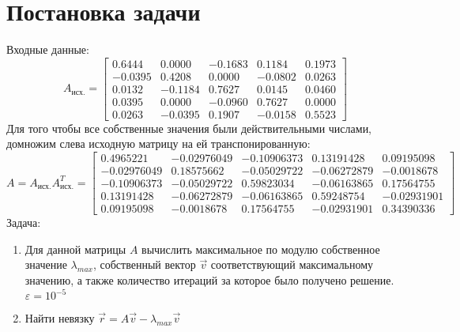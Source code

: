 \documentclass[11.4pt]{article}
\begin{document}
\section{Постановка задачи}
	Входные данные:
	\[ A_{\text{исх.}}=
		\left[
			\begin{array}{ccccc}
				0.6444 & 0.0000 & -0.1683 & 0.1184 & 0.1973\\
				-0.0395 & 0.4208 & 0.0000 & -0.0802 & 0.0263\\
				0.0132  & -0.1184 & 0.7627 & 0.0145 & 0.0460\\
				0.0395 & 0.0000 & -0.0960 & 0.7627 & 0.0000\\
				0.0263 & -0.0395 & 0.1907 & -0.0158 & 0.5523
			\end{array}
		\right]
	\]
	Для того чтобы все собственные значения были действительными числами, домножим слева исходную матрицу на ей транспонированную:
	\[ A=A_{\text{исх.}}A_{\text{исх.}}^T=
		\left[
			\begin{array}{ccccc}
				 0.4965221 & -0.02976049 & -0.10906373 &  0.13191428 & 0.09195098\\
 				-0.02976049 & 0.18575662 & -0.05029722 & -0.06272879 & -0.0018678\\
 				-0.10906373 & -0.05029722 & 0.59823034 & -0.06163865 &  0.17564755\\
 				 0.13191428 & -0.06272879 & -0.06163865 &  0.59248754 & -0.02931901\\
 				 0.09195098 & -0.0018678  & 0.17564755 & -0.02931901 &  0.34390336
			\end{array}
		\right]
	\]
	Задача:
	\begin{enumerate}
		\item Для данной матрицы $A$ вычислить максимальное по модулю собственное значение $\lambda_{max}$, собственный вектор $\vec{v}$ соответствующий максимальному значению, а также количество итераций за которое было получено решение. $\varepsilon=10^{-5}$
		\item Найти невязку $\vec{r} = A\vec{v} - \lambda_{max}\vec{v} $
	\end{enumerate}
\end{document}
